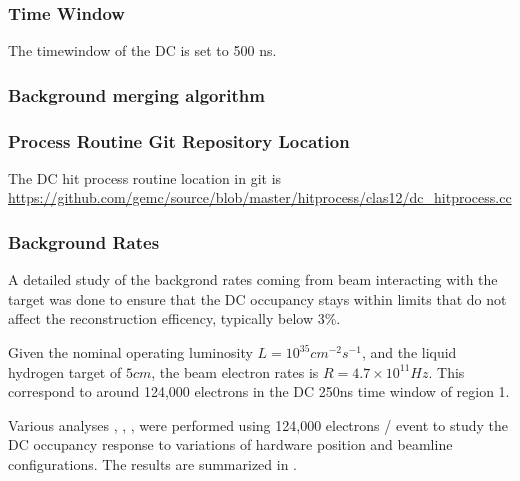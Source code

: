 \subsubsection{Time Window}

The timewindow of the DC is set to 500 ns.

\subsubsection{Background merging algorithm}

\subsubsection{Process Routine Git Repository Location}
The DC hit process routine location in git is \url{https://github.com/gemc/source/blob/master/hitprocess/clas12/dc_hitprocess.cc}


\subsubsection{Background Rates}

A detailed study of the backgrond rates coming from beam interacting with the target was done to ensure that the DC occupancy stays
within limits that do not affect the reconstruction efficency, typically below $3\%$.

Given the nominal operating luminosity $L=10^{35} cm^{-2}s^{-1}$, and the liquid hydrogen target of $5 cm$, the beam electron rates
is $R=4.7 \times 10^{11} Hz$. This correspond to around 124,000 electrons in the DC 250ns time window of region 1.

Various analyses \cite{targetStudy}, \cite{clas12Beamline}, \cite{clas12Background}, were performed using 124,000 electrons / event
to study the DC occupancy response to variations of hardware position and beamline configurations.
The results are summarized in .

